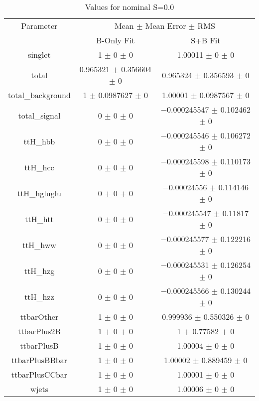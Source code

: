 \begin{table}
\centering
\caption{Values for nominal S=0.0}
\begin{tabular}{ccc}
\toprule
Parameter & \multicolumn{2}{c}{Mean $\pm$ Mean Error $\pm$ RMS}\\
 & B-Only Fit & S+B Fit\\
\midrule
singlet & \num{1} $\pm$ \num{0} $\pm$ \num{0} & \num{1.00011} $\pm$ \num{0} $\pm$ \num{0}\\
total & \num{0.965321} $\pm$ \num{0.356604} $\pm$ \num{0} & \num{0.965324} $\pm$ \num{0.356593} $\pm$ \num{0}\\
total\_background & \num{1} $\pm$ \num{0.0987627} $\pm$ \num{0} & \num{1.00001} $\pm$ \num{0.0987567} $\pm$ \num{0}\\
total\_signal & \num{0} $\pm$ \num{0} $\pm$ \num{0} & \num{-0.000245547} $\pm$ \num{0.102462} $\pm$ \num{0}\\
ttH\_hbb & \num{0} $\pm$ \num{0} $\pm$ \num{0} & \num{-0.000245546} $\pm$ \num{0.106272} $\pm$ \num{0}\\
ttH\_hcc & \num{0} $\pm$ \num{0} $\pm$ \num{0} & \num{-0.000245598} $\pm$ \num{0.110173} $\pm$ \num{0}\\
ttH\_hgluglu & \num{0} $\pm$ \num{0} $\pm$ \num{0} & \num{-0.00024556} $\pm$ \num{0.114146} $\pm$ \num{0}\\
ttH\_htt & \num{0} $\pm$ \num{0} $\pm$ \num{0} & \num{-0.000245547} $\pm$ \num{0.11817} $\pm$ \num{0}\\
ttH\_hww & \num{0} $\pm$ \num{0} $\pm$ \num{0} & \num{-0.000245577} $\pm$ \num{0.122216} $\pm$ \num{0}\\
ttH\_hzg & \num{0} $\pm$ \num{0} $\pm$ \num{0} & \num{-0.000245531} $\pm$ \num{0.126254} $\pm$ \num{0}\\
ttH\_hzz & \num{0} $\pm$ \num{0} $\pm$ \num{0} & \num{-0.000245566} $\pm$ \num{0.130244} $\pm$ \num{0}\\
ttbarOther & \num{1} $\pm$ \num{0} $\pm$ \num{0} & \num{0.999936} $\pm$ \num{0.550326} $\pm$ \num{0}\\
ttbarPlus2B & \num{1} $\pm$ \num{0} $\pm$ \num{0} & \num{1} $\pm$ \num{0.77582} $\pm$ \num{0}\\
ttbarPlusB & \num{1} $\pm$ \num{0} $\pm$ \num{0} & \num{1.00004} $\pm$ \num{0} $\pm$ \num{0}\\
ttbarPlusBBbar & \num{1} $\pm$ \num{0} $\pm$ \num{0} & \num{1.00002} $\pm$ \num{0.889459} $\pm$ \num{0}\\
ttbarPlusCCbar & \num{1} $\pm$ \num{0} $\pm$ \num{0} & \num{1.00001} $\pm$ \num{0} $\pm$ \num{0}\\
wjets & \num{1} $\pm$ \num{0} $\pm$ \num{0} & \num{1.00006} $\pm$ \num{0} $\pm$ \num{0}\\
\bottomrule
\end{tabular}
\end{table}